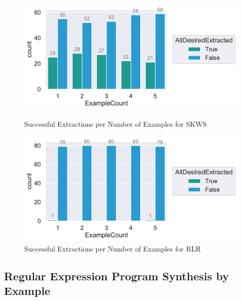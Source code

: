 \documentclass[\myrootdir/main.tex]{subfiles}
\begin{document}
\begin{figure}[htbp]
	\centering
	\begin{minipage}{0.45\textwidth}
		\centering
		\includegraphics[width=\textwidth, clip]{img/big-study/success-examples-kw.pdf}
		\caption{Successful Extractions per Number of Examples for SKWS}
		\label{fig:success-examples-kw}
	\end{minipage}\hfill
	\begin{minipage}{0.45\textwidth}
		\centering
		\includegraphics[width=\textwidth, clip]{img/big-study/success-examples-rn.pdf}
		\caption{Successful Extractions per Number of Examples for RLR}
		\label{fig:success-examples-rn}
	\end{minipage}
\end{figure}

\subsection{Regular Expression Program Synthesis by Example}
\end{document}
